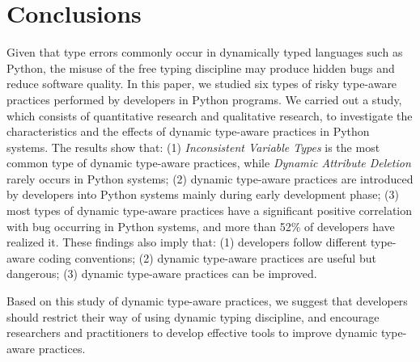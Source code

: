 
\section{Conclusions}

Given that type errors commonly occur in dynamically typed languages such as Python, the misuse of the free typing discipline may produce hidden bugs and reduce software quality. In this paper, we studied six types of risky type-aware practices performed by developers in Python programs. We carried out a study, which consists of quantitative research and qualitative research, to investigate the characteristics and the effects of dynamic type-aware practices in Python systems. The results show that: (1) \emph{Inconsistent Variable Types} is the most common type of dynamic type-aware practices, while \emph{Dynamic Attribute Deletion} rarely occurs in Python systems; (2) dynamic type-aware practices are introduced by developers into Python systems mainly during early development phase; (3) most types of dynamic type-aware practices have a significant positive correlation with bug occurring in Python systems, and more than 52\% of developers have realized it. These findings also imply that: (1) developers follow different type-aware coding conventions; (2) dynamic type-aware practices are useful but dangerous; (3) dynamic type-aware practices can be improved.

Based on this study of dynamic type-aware practices, we suggest that developers should restrict their way of using dynamic typing discipline, and encourage researchers and practitioners to develop effective tools to improve dynamic type-aware practices.
